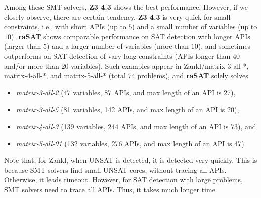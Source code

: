 \documentclass[runningheads,a4paper,oribibl]{llncs}
\begin{document}
Among these SMT solvers, {\bf Z3 4.3} shows the best performance. 
However, if we closely observe, there are certain tendency. 
{\bf Z3 4.3} is very quick for small constraints, i.e., with 
short APIs (up to $5$) and a small number of variables (up to $10$). 
{\bf raSAT} shows comparable performance on SAT detection with 
longer APIs (larger than $5$) and a larger number of variables (more than $10$), 
and sometimes outperforms on SAT detection of vary long constraints 
(APIs longer than $40$ and/or more than $20$ variables). 
Such examples appear in Zankl/matrix-3-all-*, matrix-4-all-*, and matrix-5-all-* 
(total 74 problems), and {\bf raSAT} solely solves 
\begin{itemize}
\item {\em matrix-3-all-2} (47 variables, 87 APIs, and max length of an API is 27), 
\item {\em matrix-3-all-5} (81 variables, 142 APIs, and max length of an API is 20), 
\item {\em matrix-4-all-3} (139 variables, 244 APIs, and max length of an API is 73), and 
\item {\em matrix-5-all-01} (132 variables, 276 APIs, and max length of an API is 47). 
\end{itemize}
Note that, for Zankl, when UNSAT is detected, it is detected very quickly. 
This is because SMT solvers find small UNSAT cores, without tracing all APIs.
Otherwise, it leads timeout. 
However, for SAT detection with large problems, 
SMT solvers need to trace all APIs. Thus, it takes much longer time. 
\end{document}
